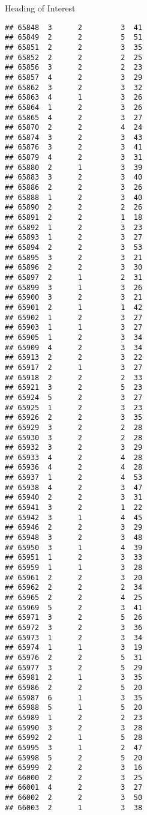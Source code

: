 \documentclass[
  ignorenonframetext,
]{beamer}
\begin{document}
\begin{frame}[fragile]{Heading of Interest}
\begin{verbatim}
## 65848  3      2         3  41
## 65849  2      2         5  51
## 65851  2      2         3  35
## 65852  2      2         2  25
## 65856  3      2         2  23
## 65857  4      2         3  29
## 65862  3      2         3  32
## 65863  4      1         3  26
## 65864  1      2         3  26
## 65865  4      2         3  27
## 65870  2      2         4  24
## 65874  3      2         3  43
## 65876  3      2         3  41
## 65879  4      2         3  31
## 65880  2      1         3  39
## 65883  3      2         3  40
## 65886  2      2         3  26
## 65888  1      2         3  40
## 65890  2      2         2  26
## 65891  2      2         1  18
## 65892  1      2         3  23
## 65893  1      2         3  27
## 65894  2      2         3  53
## 65895  3      2         3  21
## 65896  2      2         3  30
## 65897  2      1         2  31
## 65899  3      1         3  26
## 65900  3      2         3  21
## 65901  2      1         1  42
## 65902  1      2         3  27
## 65903  1      1         3  27
## 65905  1      2         3  34
## 65909  4      2         3  34
## 65913  2      2         3  22
## 65917  2      1         3  27
## 65918  2      2         2  33
## 65921  3      2         5  23
## 65924  5      2         3  27
## 65925  1      2         3  23
## 65926  2      2         3  35
## 65929  3      2         2  28
## 65930  3      2         2  28
## 65932  3      2         3  29
## 65933  4      2         4  28
## 65936  4      2         4  28
## 65937  1      2         4  53
## 65938  4      2         3  47
## 65940  2      2         3  31
## 65941  3      2         1  22
## 65942  3      1         4  45
## 65946  2      2         3  29
## 65948  3      2         3  48
## 65950  3      1         4  39
## 65951  1      2         3  33
## 65959  1      1         3  28
## 65961  2      2         3  20
## 65962  2      2         2  34
## 65965  2      2         4  25
## 65969  5      2         3  41
## 65971  3      2         5  26
## 65972  3      2         3  36
## 65973  1      2         3  34
## 65974  1      1         3  19
## 65976  2      2         5  31
## 65977  3      2         5  29
## 65981  2      1         3  35
## 65986  2      2         5  20
## 65987  6      1         3  35
## 65988  5      1         5  20
## 65989  1      2         2  23
## 65990  3      2         3  28
## 65992  2      1         5  28
## 65995  3      1         2  47
## 65998  5      2         5  20
## 65999  2      2         3  16
## 66000  2      2         3  25
## 66001  4      2         3  27
## 66002  2      2         3  50
## 66003  2      1         3  38

\end{verbatim}
\end{frame}
\end{document}
